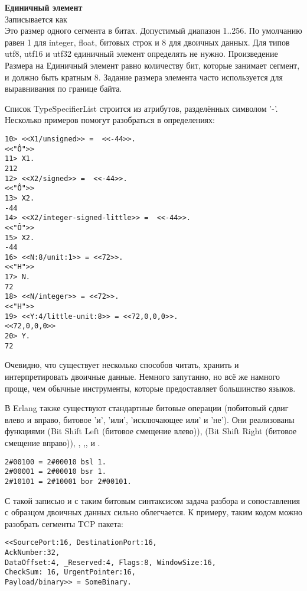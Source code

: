 \begin{minipage}{\textwidth}
    \textbf{Единичный элемент}\\ 
    Записывается как \\ 
    Это размер одного сегмента в битах.
    Допустимый диапазон 1..256. По умолчанию равен 1 для integer, float, битовых строк и 8 для двоичных данных.
    Для типов utf8, utf16 и utf32 единичный элемент определять не нужно.
    Произведение Размера на Единичный элемент равно количеству бит, которые занимает сегмент, и должно быть кратным 8.
    Задание размера элемента часто используется для выравнивания по границе байта.\\  
\end{minipage}

Список TypeSpecifierList строится из атрибутов, разделённых символом '\--'.\\ 

Несколько примеров помогут разобраться в определениях:
\begin{lstlisting}[style=repl]
10> <<X1/unsigned>> =  <<-44>>.
<<"Ô">>
11> X1.
212
12> <<X2/signed>> =  <<-44>>. 
<<"Ô">>
13> X2.
-44
14> <<X2/integer-signed-little>> =  <<-44>>.
<<"Ô">>
15> X2.
-44
16> <<N:8/unit:1>> = <<72>>.
<<"H">>
17> N.
72
18> <<N/integer>> = <<72>>.
<<"H">>
19> <<Y:4/little-unit:8>> = <<72,0,0,0>>.     
<<72,0,0,0>>
20> Y.
72
\end{lstlisting}

Очевидно, что существует несколько способов читать, хранить и интерпретировать двоичные данные.
Немного запутанно, но всё же намного проще, чем обычные инструменты, которые предоставляет большинство языков.

В Erlang также существуют стандартные битовые операции (побитовый сдвиг влево и вправо, битовое 'и', 'или', 'исключающее или' и 'не').
Они реализованы функциями  (Bit Shift Left (битовое смещение влево)),  (Bit Shift Right (битовое смещение вправо)), , ,, и .
\begin{lstlisting}[style=repl]
2#00100 = 2#00010 bsl 1.
2#00001 = 2#00010 bsr 1.
2#10101 = 2#10001 bor 2#00101.
\end{lstlisting}

С такой записью и с таким битовым синтаксисом задача разбора и сопоставления с образцом двоичных данных сильно облегчается.
К примеру, таким кодом можно разобрать сегменты TCP пакета:
\begin{lstlisting}[style=repl]
<<SourcePort:16, DestinationPort:16,
AckNumber:32,
DataOffset:4, _Reserved:4, Flags:8, WindowSize:16,
CheckSum: 16, UrgentPointer:16,
Payload/binary>> = SomeBinary.
\end{lstlisting}

